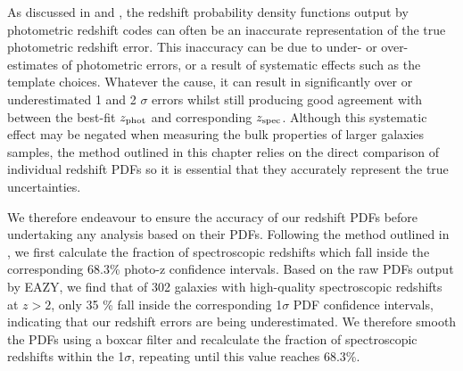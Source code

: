 As discussed in \citet{Hildebrandt:2008jh} and \citet{Dahlen:2013eu}, the redshift probability density functions output by photometric redshift codes can often be an inaccurate representation of the true photometric redshift error. This inaccuracy can be due to under- or over-estimates of photometric errors, or a result of systematic effects such as the template choices. Whatever the cause, it can result in significantly over or underestimated 1 and 2 $\sigma$ errors whilst still producing good agreement with between the best-fit $z_{\rm{phot}}$ and corresponding $z_{\rm{spec}}$. Although this systematic effect may be negated when measuring the bulk properties of larger galaxies samples, the method outlined in this chapter relies on the direct comparison of individual redshift PDFs so it is essential that they accurately represent the true uncertainties.

We therefore endeavour to ensure the accuracy of our redshift PDFs before undertaking any analysis based on their PDFs. Following the method outlined in \citet{Dahlen:2013eu}, we first calculate the fraction of spectroscopic redshifts which fall inside the corresponding 68.3\% photo-z confidence intervals. Based on the raw PDFs output by EAZY, we find that of 302 galaxies with high-quality spectroscopic redshifts at $z > 2$, only 35 \% fall inside the corresponding 1$\sigma$ PDF confidence intervals, indicating that our redshift errors are being underestimated. We therefore smooth the PDFs using a boxcar filter and recalculate the fraction of spectroscopic redshifts within the 1$\sigma$, repeating until this value reaches 68.3\%.


